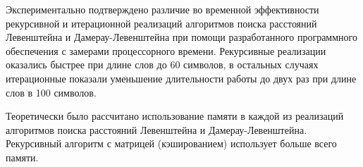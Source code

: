 \documentclass[12pt]{report}
\begin{document}
    Экспериментально подтверждено различие во временной эффективности рекурсивной и итерационной
    реализаций алгоритмов поиска расстояний Левенштейна и Дамерау-Левенштейна
    при помощи разработанного программного обеспечения с замерами процессорного времени.
    Рекурсивные реализации оказались быстрее при длине слов до 60 символов, в остальных случаях
    итерационные показали уменьшение длительности работы до двух раз при длине слов в 100 символов.

    Теоретически было рассчитано использование памяти в каждой из реализаций алгоритмов поиска
    расстояний Левенштейна и Дамерау-Левенштейна. Рекурсивный алгоритм с матрицей (кэшированием)
    использует больше всего памяти.

    \newpage

\end{document}
